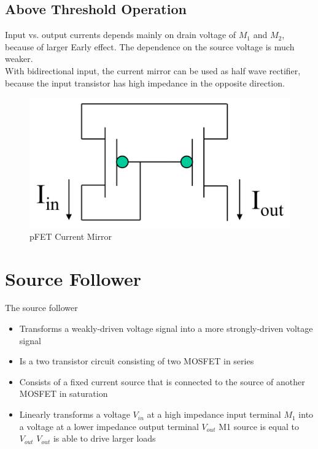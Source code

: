 \subsection{Above Threshold Operation}
Input vs. output currents depends mainly on drain voltage of $M_1$ and $M_2$, because of larger Early effect. The dependence on the source voltage is much weaker.\\
With bidirectional input, the current mirror can be used as half wave rectifier, because the input transistor has high impedance in the opposite direction.

\begin{figure}[htbp]
  \centering
  \includegraphics[scale=0.5]{pics/current_mirror_pfet.png}
  \caption{pFET Current Mirror \cite{lec4}}
  \label{fig:pFET_Current_Mirror}
\end{figure}\bigskip





\section{Source Follower}
The source follower
\begin{itemize}
\item Transforms a weakly-driven voltage signal into a more strongly-driven voltage signal
\item Is a two transistor circuit consisting of two MOSFET in series
\item Consists of a fixed current source that is connected to the source of another MOSFET in saturation 
\item Linearly transforms a voltage $V_{in}$ at a high impedance input terminal $M_1$ into a voltage at a lower impedance output terminal $V_{out}$
\subitem M1 source is equal to $V_{out}$
\subitem $V_{out}$ is able to drive larger loads
\end{itemize}

